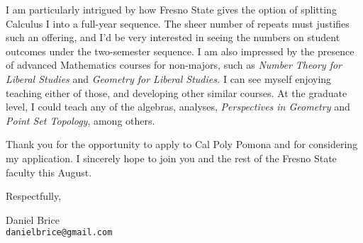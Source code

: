 \documentclass[10pt]{article}
\begin{document}
I am particularly intrigued by how Fresno State gives the option
of splitting Calculus I into a full-year sequence.
The sheer number of repeats must justifies such an offering,
and I'd be very interested in seeing the numbers on student outcomes
under the two-semester sequence.
I am also impressed by the presence of advanced Mathematics courses
for non-majors, such as \emph{Number Theory for Liberal Studies}
and \emph{Geometry for Liberal Studies.}
I can see myself enjoying teaching either of those,
and developing other similar courses.
At the graduate level, I could teach any
of the algebras, analyses,
\emph{Perspectives in Geometry}
and \emph{Point Set Topology}, among others.

Thank you for the opportunity to apply to Cal Poly Pomona
and for considering my application.
I sincerely hope to join you and the rest
of the Fresno State faculty this August.

\vfill

Respectfully,

\vfill

Daniel Brice\\
\texttt{danielbrice@gmail.com}

\label{page:last}
\end{document}
